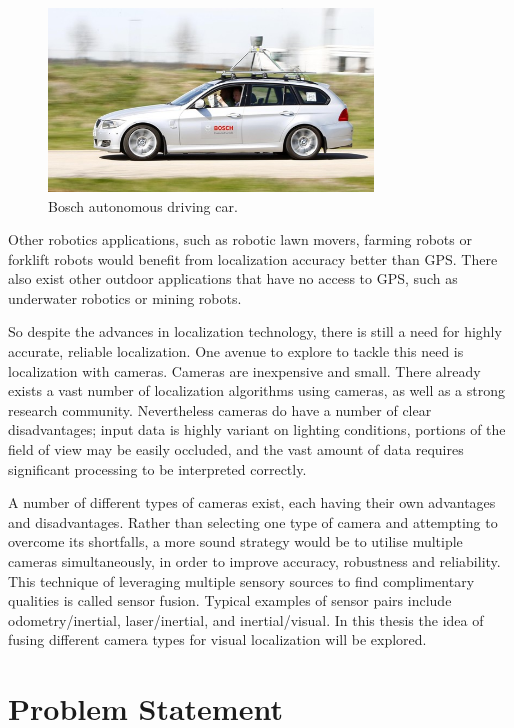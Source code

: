 \begin{figure}[h]
  \centering
    \includegraphics[width=0.77\textwidth]{chapters/images/bosch_car}
  \caption{Bosch autonomous driving car.}
  \label{fig:bosch_car}
\end{figure}

Other robotics applications, such as robotic lawn movers, farming robots or forklift robots would benefit from localization accuracy better than GPS.  There also exist other outdoor applications that have no access to GPS, such as underwater robotics or mining robots.

So despite the advances in localization technology, there is still a need for highly accurate, reliable localization.  One avenue to explore to tackle this need is localization with cameras.  Cameras are inexpensive and small.  There already exists a vast number of localization algorithms using cameras, as well as a strong research community.  Nevertheless cameras do have a number of clear disadvantages; input data is highly variant on lighting conditions, portions of the field of view may be easily occluded, and the vast amount of data requires significant processing to be interpreted correctly.

A number of different types of cameras exist, each having their own advantages and disadvantages.  Rather than selecting one type of camera and attempting to overcome its shortfalls, a more sound strategy would be to utilise multiple cameras simultaneously, in order to improve accuracy, robustness and reliability.  This technique of leveraging multiple sensory sources to find complimentary qualities is called sensor fusion.  Typical examples of sensor pairs include odometry/inertial, laser/inertial, and inertial/visual.  In this thesis the idea of fusing different camera types for visual localization will be explored.

\section{Problem Statement}

